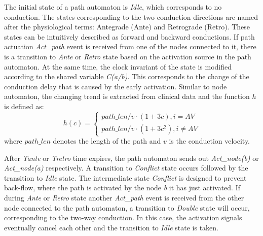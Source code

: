 The initial state of a path automaton is \emph{Idle}, which corresponds to no conduction. The states corresponding to the two conduction directions are named after the physiological terms: Antegrade (Ante) and Retrograde (Retro). These states can be intuitively described as forward and backward conductions. If path actuation \emph{Act\_path} event is received from one of the nodes connected to it, there is a transition to \emph{Ante} or \emph{Retro} state based on the activation source in the path automaton. At the same time, the clock invariant of the state is modified according to the shared variable \emph{C(a/b)}. This corresponds to the change of the conduction delay that is caused by the early activation. Similar to node automaton, the changing trend is extracted from clinical data and the function $h$ is defined as:
\begin{equation} 
						h(c) = \left\{
						\begin{array}{lr}
						
						path\_len/v\cdot (1+3c), i=AV\\
						path\_len/v\cdot (1+3c^2), i\neq AV
						\end{array}
						\right.
						\end{equation}
where $path\_len$ denotes the length of the path and $v$ is the conduction velocity.

After \emph{Tante} or \emph{Tretro} time expires, the path automaton sends out \emph{Act\_node(b)} or \emph{Act\_node(a)} respectively. A transition to \emph{Conflict} state occurs followed by the transition to \emph{Idle} state. The intermediate state \emph{Conflict} is designed to prevent back-flow, where the path is activated by the node \emph{b} it has just activated. If during \emph{Ante} or \emph{Retro} state another \emph{Act\_path} event is received from the other node connected to the path automaton, a transition to \emph{Double} state will occur, corresponding to the two-way conduction. In this case, the activation signals eventually cancel each other and the transition to \emph{Idle} state is taken.


